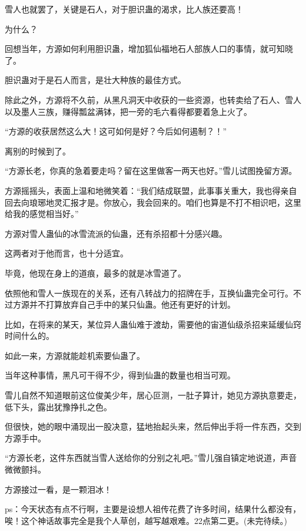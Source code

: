 \begin{this_body}
雪人也就罢了，关键是石人，对于胆识蛊的渴求，比人族还要高！

为什么？

回想当年，方源如何利用胆识蛊，增加狐仙福地石人部族人口的事情，就可知晓了。

胆识蛊对于是石人而言，是壮大种族的最佳方式。

除此之外，方源将不久前，从黑凡洞天中收获的一些资源，也转卖给了石人、雪人以及墨人三族，赚得瓢盆满钵，把一旁的毛六看得都要着急上火了。

“方源的收获居然这么大！这可如何是好？今后如何遏制？！”

离别的时候到了。

“方源长老，你真的急着要走吗？留在这里做客一两天也好。”雪儿试图挽留方源。

方源摇摇头，表面上温和地微笑着：“我们结成联盟，此事事关重大，我也得亲自回去向琅琊地灵汇报才是。你放心，我会回来的。咱们也算是不打不相识吧，这里给我的感觉相当好。”

方源对雪人蛊仙的冰雪流派的仙蛊，还有杀招都十分感兴趣。

这两者对于他而言，也十分适宜。

毕竟，他现在身上的道痕，最多的就是冰雪道了。

依照他和雪人一族现在的关系，还有八转战力的招牌在手，互换仙蛊完全可行。不过方源并不打算放弃自己手中的某只仙蛊。他还有更好的计划。

比如，在将来的某天，某位异人蛊仙难于渡劫，需要他的宙道仙级杀招来延缓仙窍时间什么的。

如此一来，方源就能趁机索要仙蛊了。

当年这种事情，黑凡可干得不少，得到仙蛊的数量也相当可观。

雪儿自然不知道眼前这位俊美少年，居心叵测，一肚子算计，她见方源执意要走，低下头，露出犹豫挣扎之色。

但很快，她的眼中涌现出一股决意，猛地抬起头来，然后伸出手将一件东西，交到方源手中。

“方源长老，这件东西就当雪人送给你的分别之礼吧。”雪儿强自镇定地说道，声音微微颤抖。

方源接过一看，是一颗泪冰！

ps：今天状态有点不行啊，主要是设想人祖传花费了许多时间，结果什么都没有，唉！这个神话故事完全是我个人草创，越写越艰难。22点第二更。(未完待续。)

\end{this_body}

